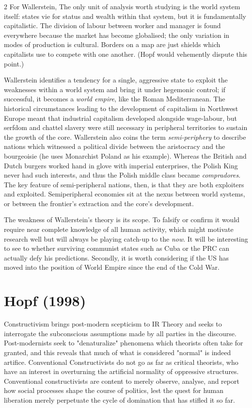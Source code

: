 \documentclass[letterpaper,12pt]{article}
\begin{document}
\begin {multicols}{2}
For Wallerstein,  The only unit of analysis worth studying is the world system itself: states vie for status and wealth within that system, but it is fundamentally capitalistic. The division of labour between worker and manager is found everywhere because the market has become globalised; the only variation in modes of production is cultural. Borders on a map are just shields which capitalists use to compete with one another. (Hopf would vehemently dispute this point.)

Wallerstein identifies a tendency for a single, aggressive state to exploit the weaknesses within a world system and bring it under hegemonic control; if successful, it becomes a \textit{world empire}, like the Roman Mediterranean. The historical circumstances leading to the development of capitalism in Northwest Europe meant that industrial capitalism developed alongside wage-labour, but serfdom and chattel slavery were still necessary in peripheral territories to sustain the growth of the core. Wallerstein also coins the term \textit{semi-periphery} to describe nations which witnessed a political divide between the aristocracy and the bourgeoisie (he uses Monarchist Poland as his example). Whereas the British and Dutch burgers worked hand in glove with imperial enterprises, the Polish King never had such interests, and thus the Polish middle class became \textit{compradores}. The key feature of semi-peripheral nations, then, is that they are both exploiters and exploited. Semiperipheral economies sit at the nexus between world systems, or between the frontier's extraction and the core's development.

The weakness of Wallerstein's theory is its scope. To falsify or confirm it would require near complete knowledge of all human activity, which might motivate research well but will always be playing catch-up to the \textit{now}. It will be interesting to see to whether surviving communist states such as Cuba or the PRC can actually defy his predictions. Secondly, it is worth considering if the US has moved into the position of World Empire since the end of the Cold War.

\section*{Hopf (1998)}

Constructivism brings post-modern scepticism to IR Theory and seeks to interrogate the subconscious assumptions made by all parties in the discourse. Post-modernists seek to "denaturalize" phenomena which theorists often take for granted, and this reveals that much of what is considered "normal" is indeed artifice. Conventional Constructivists do not go as far as critical theorists, who have an interest in overturning the artificial normality of oppressive structures. Conventional constructivists are content to merely observe, analyse, and report how social processes shape the course of politics, lest the quest for human liberation merely perpetuate the cycle of domination that has stifled it so far.


\end{multicols}
\end{document}
